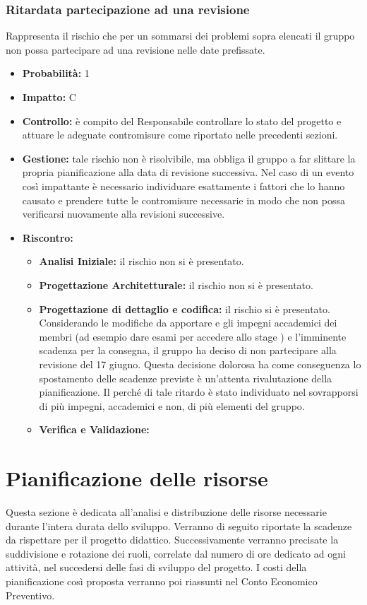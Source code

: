 \documentclass[a4paper,11pt]{article}
\begin{document}
		\subsubsection{Ritardata partecipazione ad una revisione}							Rappresenta il rischio che per un sommarsi dei problemi sopra elencati il gruppo non possa partecipare ad una revisione nelle date prefissate.
		\begin{itemize}
		\item \textbf{Probabilità:} 1
		\item \textbf{Impatto:} C
		\item \textbf{Controllo:} è compito del Responsabile controllare lo stato del progetto e attuare le adeguate contromisure come riportato nelle precedenti sezioni.
		\item \textbf{Gestione:} tale rischio non è risolvibile, ma obbliga il gruppo a far slittare la propria pianificazione alla data di revisione successiva. Nel caso di un evento così impattante è necessario individuare esattamente i fattori che lo hanno causato e prendere tutte le contromisure necessarie in modo che non possa verificarsi nuovamente alla revisioni successive.
		\item \textbf{Riscontro:}
			\begin{itemize}
				\item\textbf{Analisi Iniziale:} il rischio non si è presentato.
				\item\textbf{Progettazione Architetturale:} il rischio non si è presentato.
				\item\textbf{Progettazione di dettaglio e codifica:} il rischio si è presentato. Considerando le modifiche da apportare e gli impegni accademici dei membri (ad esempio dare esami per accedere allo stage ) e l'imminente scadenza per la consegna, il gruppo ha deciso di non partecipare alla revisione del 17 giugno. Questa decisione dolorosa ha come conseguenza lo spostamento delle scadenze previste è un'attenta rivalutazione della pianificazione. Il perché di tale ritardo è stato individuato nel sovrapporsi di più impegni, accademici e non, di più elementi del gruppo.
				\item\textbf{Verifica e Validazione:}
			\end{itemize}
		\end{itemize}
	\pagebreak	
		
	\newpage
	\section{Pianificazione delle risorse}	
	Questa sezione è dedicata all'analisi e distribuzione delle risorse necessarie durante l'intera durata dello sviluppo. Verranno di seguito riportate la scadenze da rispettare per il progetto didattico. Successivamente verranno precisate la suddivisione e rotazione dei ruoli, correlate dal numero di ore dedicato ad ogni attività, nel succedersi delle fasi di sviluppo del progetto. I costi della pianificazione così proposta verranno poi riassunti nel Conto Economico Preventivo.
\end{document}
